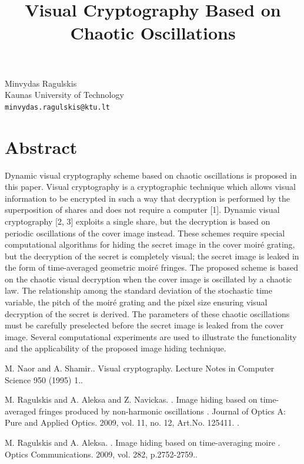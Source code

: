 \documentclass[article, A4, 11pt]{llncs}%
\begin{document}
\title{Visual Cryptography Based on Chaotic Oscillations}
 \author{} \institute{}
\maketitle
\begin{center}
{\large Minvydas Ragulskis}\\
Kaunas University of Technology\\
{\tt minvydas.ragulskis@ktu.lt}
\end{center}

\section*{Abstract}
Dynamic visual cryptography scheme based on chaotic oscillations is proposed in this paper. Visual cryptography is a cryptographic technique which allows visual information to be encrypted in such a way that decryption is performed by the superposition of shares and does not require a computer [1]. Dynamic visual cryptography [2, 3] exploits a single share, but the decryption is based on periodic oscillations of the cover image instead. These schemes require special computational algorithms for hiding the secret image in the cover moiré grating, but the decryption of the secret is completely visual; the secret image is leaked in the form of time-averaged geometric moiré fringes. The proposed scheme is based on the chaotic visual decryption when the cover image is oscillated by a chaotic law. The relationship among the standard deviation of the stochastic time variable, the pitch of the moiré grating and the pixel size ensuring visual decryption of the secret is derived. The parameters of these chaotic oscillations must be carefully preselected before the secret image is leaked from the cover image. Several computational experiments are used to illustrate the functionality and the applicability of the proposed image hiding
technique.


\begin{thebibliography}{10}
{\sc M. Naor and A. Shamir.}. {Visual cryptography}. Lecture Notes in Computer Science 950 (1995) 1..

{\sc M. Ragulskis and A. Aleksa and Z. Navickas. }. {Image hiding based on time-averaged fringes produced by non-harmonic oscillations }. Journal of Optics A: Pure and Applied Optics. 2009, vol. 11, no. 12, Art.No. 125411. .

{\sc M. Ragulskis and A. Aleksa. }. {Image hiding based on time-averaging moire }. Optics Communications. 2009, vol. 282, p.2752-2759..
\end{thebibliography} %
\end{document}
